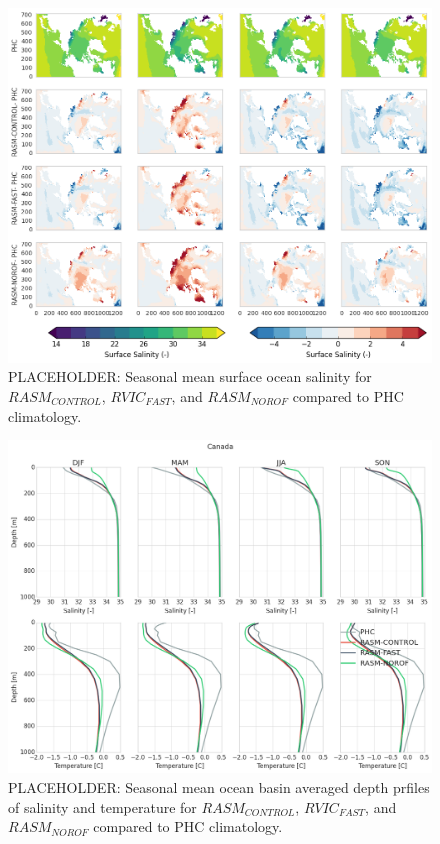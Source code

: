 \documentclass[jgrga, draft]{agutex}
\begin{document}
\clearpage
\begin{figure}
\noindent\includegraphics[width=40pc,natwidth=1]{Figure_7}
\caption{PLACEHOLDER: Seasonal mean surface ocean salinity for $RASM_{CONTROL}$, $RVIC_{FAST}$, and $RASM_{NOROF}$ compared to PHC climatology.}
\label{fig:7}
\end{figure}

\clearpage
\begin{figure}
\noindent\includegraphics[width=40pc,natwidth=1]{Figure_8}
\caption{PLACEHOLDER: Seasonal mean ocean basin averaged depth prfiles of salinity and temperature for $RASM_{CONTROL}$, $RVIC_{FAST}$, and $RASM_{NOROF}$ compared to PHC climatology.}
\label{fig:8}
\end{figure}
\end{document}
